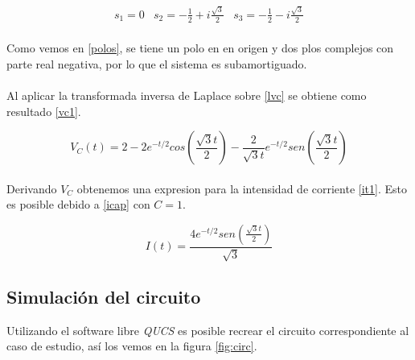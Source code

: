 \documentclass[letterpaper,12pt]{article} %
\begin{document}
\begin{equation}
\begin{matrix}
s_1=0&s_2=-\frac{1}{2}+i\frac{\sqrt{3}}{2}&s_3=-\frac{1}{2}-i\frac{\sqrt{3}}{2}
\end{matrix}
\label{polos}
\end{equation}
\\ 

Como vemos en \eqref{polos}, se tiene un polo en en origen y dos plos complejos con parte real negativa, por lo que el sistema es subamortiguado.\\ \\
 
Al aplicar la transformada inversa de Laplace sobre \eqref{lvc} se obtiene como resultado \eqref{vc1}.

\begin{equation}
V_C(t)=2-2e^{-t/2}cos\left( \frac{\sqrt{3}t}{2}\right) -\frac{2}{\sqrt{3}t}e^{-t/2}sen\left( \frac{\sqrt{3}t}{2}\right) 
\label{vc1}
\end{equation}\\

Derivando $V_C$ obtenemos una expresion para la intensidad de corriente \eqref{it1}. Esto es posible debido a \eqref{icap} con $C=1$.

\begin{equation}
I(t)=\frac{4e^{-t/2}sen\left( \frac{\sqrt{3}t}{2}\right)}{\sqrt{3}}
\label{it1}
\end{equation}

\newpage
\subsection*{Simulación del circuito}

Utilizando el software libre \textit{QUCS} es posible recrear el circuito correspondiente al caso de estudio, así los vemos en la figura \ref{fig:circ}.
\end{document}
